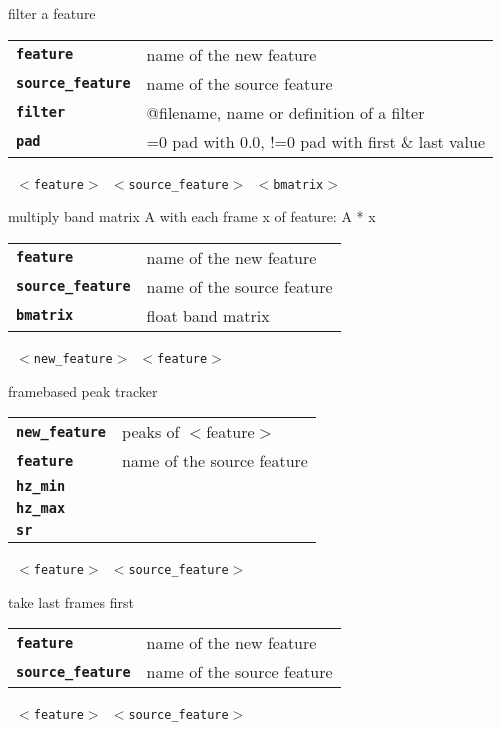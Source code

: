 \begin{description}
\begin{description}
        filter a feature

      \begin{tabular}{ll}
 \texttt{\textbf{feature}} &         name of the new feature \\
 \texttt{\textbf{source\_feature}} &  name of the source feature \\
 \texttt{\textbf{filter}} &          @filename, name or definition of a filter \\
 \texttt{\textbf{pad}} &              =0 pad with 0.0, !=0 pad with first \& last value  \\
      \end{tabular}
       \texttt{ $<$feature$>$ $<$source\_feature$>$ $<$bmatrix$>$} \

        multiply band matrix A with each frame x of feature: A * x

      \begin{tabular}{ll}
 \texttt{\textbf{feature}} &         name of the new feature \\
 \texttt{\textbf{source\_feature}} &  name of the source feature \\
 \texttt{\textbf{bmatrix}} &         float band matrix \\
      \end{tabular}
       \texttt{ $<$new\_feature$>$ $<$feature$>$   } \

        framebased peak tracker

      \begin{tabular}{ll}
 \texttt{\textbf{new\_feature}} &  peaks of $<$feature$>$ \\
 \texttt{\textbf{feature}} &      name of the source feature \\
 \texttt{\textbf{hz\_min}} &          \\
 \texttt{\textbf{hz\_max}} &          \\
 \texttt{\textbf{sr}} &              \\
      \end{tabular}
       \texttt{ $<$feature$>$ $<$source\_feature$>$} \

        take last frames first

      \begin{tabular}{ll}
 \texttt{\textbf{feature}} &         name of the new feature \\
 \texttt{\textbf{source\_feature}} &  name of the source feature \\
      \end{tabular}
       \texttt{ $<$feature$>$ $<$source\_feature$>$    } \


\end{description}
\end{description}
